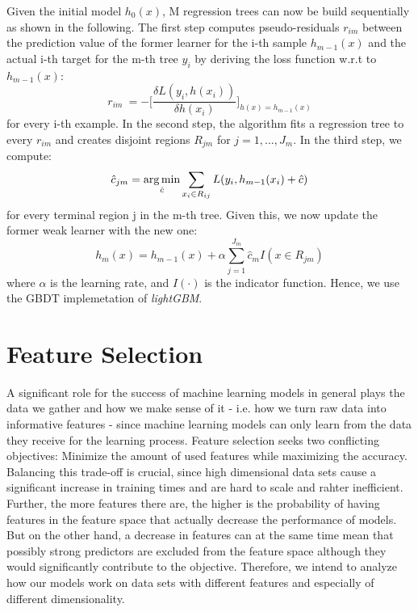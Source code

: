 Given the initial model $ h_0(x) $, M regression trees can now be build sequentially as shown in the following. 
The first step computes pseudo-residuals $ r_{im} $ between the prediction value of the former learner for the i-th sample $ h_{m-1}(x) $ and the actual i-th target for the m-th tree $ y_i $ by deriving the loss function w.r.t to $ h_{m-1}(x) $: 
\begin{equation}
	r_{im}\ = - \bigg[\dfrac{\delta L(y_i, h(x_i))}{\delta h(x_i)}\bigg]_{h(x) = h_{m-1}(x)}
\end{equation} 
for every i-th example.
In the second step, the algorithm fits a regression tree to every $ r_{im} $ and creates disjoint regions $ R_{jm} $ for $j = 1, ..., J_m$. 
In the third step, we compute: 
\begin{equation}
	\hat{c}_{jm} = \operatorname*{arg\,min}_{\hat{c}} \sum_{x_i \in R_{ij}} L(y_i, h_{m-1}(x_i) + \hat{c})
\end{equation}
for every terminal region j in the m-th tree. 
Given this, we now update the former weak learner with the new one:
\begin{equation}
	h_m(x) = h_{m-1}(x) + \alpha \sum_{j=1}^{J_m} \hat{c}_{m}I(x \in R_{jm})
\end{equation}
where $ \alpha $ is the learning rate, and $ I(\cdot) $ is the indicator function.
Hence, we use the GBDT implemetation of \textit{lightGBM}.


\section{Feature Selection}\label{sec:fs}

A significant role for the success of machine learning models in general plays the data we gather and how we make sense of it - i.e. how we turn raw data into informative features - since machine learning models can only learn from the data they receive for the learning process. Feature selection seeks two conflicting objectives: Minimize the amount of used features while maximizing the accuracy. Balancing this trade-off is crucial, since high dimensional data sets cause a significant increase in training times and are hard to scale and rahter inefficient. Further, the more features there are, the higher is the probability of having features in the feature space that actually decrease the performance of models. But on the other hand, a decrease in features can at the same time mean that possibly strong predictors are excluded from the feature space although they would significantly contribute to the objective. Therefore, we intend to analyze how our models work on data sets with different features and especially of different dimensionality.   

